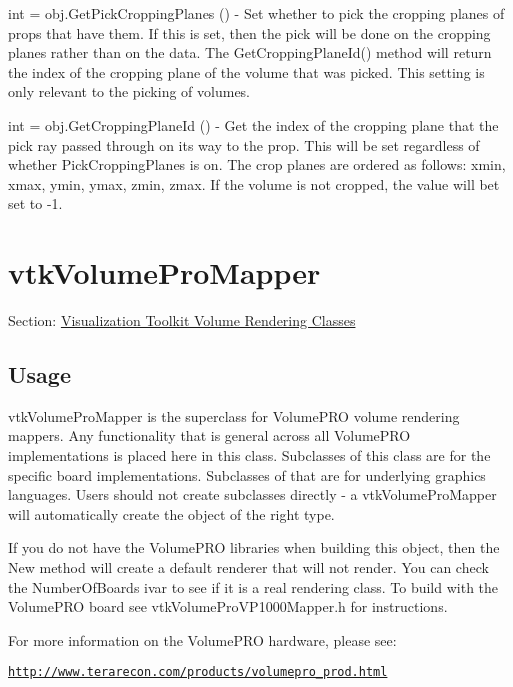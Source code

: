 \begin{DoxyItemize}
\item {\ttfamily int = obj.\-Get\-Pick\-Cropping\-Planes ()} -\/ Set whether to pick the cropping planes of props that have them. If this is set, then the pick will be done on the cropping planes rather than on the data. The Get\-Cropping\-Plane\-Id() method will return the index of the cropping plane of the volume that was picked. This setting is only relevant to the picking of volumes.  
\item {\ttfamily int = obj.\-Get\-Cropping\-Plane\-Id ()} -\/ Get the index of the cropping plane that the pick ray passed through on its way to the prop. This will be set regardless of whether Pick\-Cropping\-Planes is on. The crop planes are ordered as follows\-: xmin, xmax, ymin, ymax, zmin, zmax. If the volume is not cropped, the value will bet set to -\/1.  
\end{DoxyItemize}\hypertarget{vtkvolumerendering_vtkvolumepromapper}{}\section{vtk\-Volume\-Pro\-Mapper}\label{vtkvolumerendering_vtkvolumepromapper}
Section\-: \hyperlink{sec_vtkvolumerendering}{Visualization Toolkit Volume Rendering Classes} \hypertarget{vtkwidgets_vtkxyplotwidget_Usage}{}\subsection{Usage}\label{vtkwidgets_vtkxyplotwidget_Usage}
vtk\-Volume\-Pro\-Mapper is the superclass for Volume\-P\-R\-O volume rendering mappers. Any functionality that is general across all Volume\-P\-R\-O implementations is placed here in this class. Subclasses of this class are for the specific board implementations. Subclasses of that are for underlying graphics languages. Users should not create subclasses directly -\/ a vtk\-Volume\-Pro\-Mapper will automatically create the object of the right type.

If you do not have the Volume\-P\-R\-O libraries when building this object, then the New method will create a default renderer that will not render. You can check the Number\-Of\-Boards ivar to see if it is a real rendering class. To build with the Volume\-P\-R\-O board see vtk\-Volume\-Pro\-V\-P1000\-Mapper.\-h for instructions.

For more information on the Volume\-P\-R\-O hardware, please see\-:

\href{http://www.terarecon.com/products/volumepro_prod.html}{\tt http\-://www.\-terarecon.\-com/products/volumepro\-\_\-prod.\-html}

